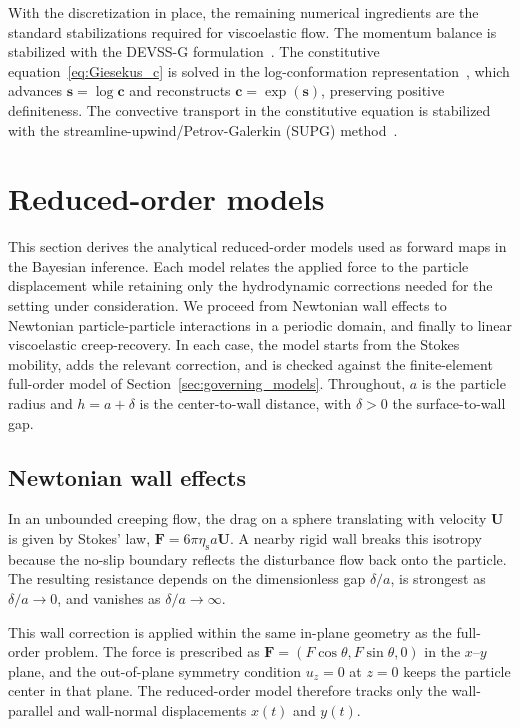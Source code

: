 \documentclass{elsarticle}
\renewcommand{\vec}[1]{\boldsymbol{#1}}
\newcommand{\ten}[1]{\boldsymbol{#1}}
\begin{document}
With the discretization in place, the remaining numerical ingredients
are the standard stabilizations required for viscoelastic flow. The
momentum balance is stabilized with the DEVSS-G
formulation~\cite{guenette1995new,bogaerds2002stability}. The
constitutive equation~\eqref{eq:Giesekus_c} is solved in the
log-conformation representation~\cite{fattal2004constitutive,hulsen2005flow},
which advances $\ten{s}=\log\ten{c}$ and reconstructs
$\ten{c}=\exp(\ten{s})$, preserving positive definiteness. The
convective transport in the constitutive equation is stabilized with the
streamline-upwind/Petrov-Galerkin (SUPG)
method~\cite{brooks1982streamline}.

\section{Reduced-order models}
\label{sec:rom}

This section derives the analytical reduced-order models used as forward
maps in the Bayesian inference. Each model relates the applied force to
the particle displacement while retaining only the hydrodynamic
corrections needed for the setting under consideration. We proceed from
Newtonian wall effects to Newtonian particle-particle interactions in a
periodic domain, and finally to linear viscoelastic creep-recovery. In
each case, the model starts from the Stokes mobility, adds the relevant
correction, and is checked against the finite-element full-order model of
Section~\ref{sec:governing_models}. Throughout, $a$ is the particle
radius and $h = a+\delta$ is the center-to-wall distance, with
$\delta>0$ the surface-to-wall gap.

\subsection{Newtonian wall effects}
\label{sec:wall_corrections}

In an unbounded creeping flow, the drag on a sphere translating with
velocity $\vec{U}$ is given by Stokes' law,
$\vec{F}=6\pi\eta_{\mathrm{s}}a\vec{U}$. A nearby rigid wall breaks this
isotropy because the no-slip boundary reflects the disturbance flow back
onto the particle. The resulting resistance depends on the dimensionless
gap $\delta/a$, is strongest as $\delta/a\to0$, and vanishes as
$\delta/a\to\infty$.

This wall correction is applied within the same in-plane geometry as the
full-order problem. The force is prescribed as
$\vec{F}=(F\cos\theta,F\sin\theta,0)$ in the $x$--$y$ plane, and the
out-of-plane symmetry condition $u_z=0$ at $z=0$ keeps the particle
center in that plane. The reduced-order model therefore tracks only the
wall-parallel and wall-normal displacements $x(t)$ and $y(t)$.
\end{document}
